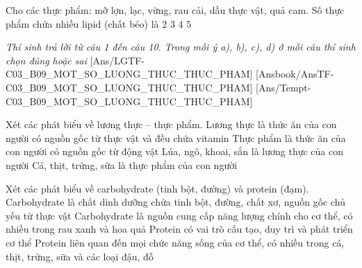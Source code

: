 \documentclass[Main.tex]{subfiles}
\begin{document}
\begin{ex}%
	Cho các thực phẩm: mỡ lợn, lạc, vừng, rau cải, dầu thực vật, quả cam. Số thực phẩm chứa nhiều lipid (chất béo) là
	\choice
	{$2$}
	{$3$}
	{\True $4$}
	{$5$}
\end{ex}

\textit{\large Thí sinh trả lời từ câu 1 đến câu 10. Trong mỗi ý a), b), c), d) ở mỗi câu thí sinh chọn đúng hoặc sai}
[Ans/LGTF-C03_B09_MOT_SO_LUONG_THUC_THUC_PHAM]
[Ansbook/AnsTF-C03_B09_MOT_SO_LUONG_THUC_THUC_PHAM]
[Ans/Tempt-C03_B09_MOT_SO_LUONG_THUC_THUC_PHAM]
\setcounter{ex}{0}

\begin{ex}%
	Xét các phát biểu về lương thực -- thực phẩm.
	\choiceTF
	{Lương thực là thức ăn của con người có nguồn gốc từ thực vật và đều chứa vitamin}
	{Thực phẩm là thức ăn của con người có nguồn gốc từ động vật}
	{\True Lúa, ngô, khoai, sắn là lương thực của con người}
	{\True Cá, thịt, trứng, sữa là thực phẩm của con người}
\end{ex}

\begin{ex}%
	Xét các phát biểu về carbohydrate (tinh bột, đường) và protein (đạm).
	\choiceTF
	{\True Carbohydrate là chất dinh dưỡng chứa tinh bột, đường, chất xơ, nguồn gốc chủ yếu từ thực vật}
	{Carbohydrate là nguồn cung cấp năng lượng chính cho cơ thể, có nhiều trong rau xanh và hoa quả}
	{\True Protein có vai trò cấu tạo, duy trì và phát triển cơ thể}
	{\True Protein liên quan đến mọi chức năng sống của cơ thể, có nhiều trong cá, thịt, trứng, sữa và các loại đậu, đỗ}
\end{ex}
\end{document}
